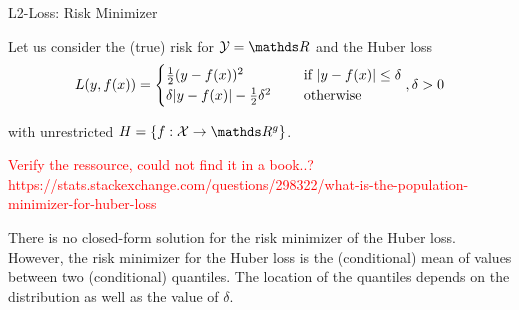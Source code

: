 \begin{vbframe}{L2-Loss: Risk Minimizer}

Let us consider the (true) risk for  $\Yspace = \R$ and the Huber loss
$$
L(y, f(x)) = \begin{cases}
  \frac{1}{2}(y - f(x))^2  & \text{ if } |y - f(x)| \le \delta \\
  \delta |y - f(x)|-\frac{1}{2}\delta^2 \quad & \text{ otherwise }
  \end{cases}, \delta > 0
$$

 with unrestricted $\Hspace = \{f: \Xspace \to \R^g\}$. 

\lz 


\textcolor{red}{Verify the ressource, could not find it in a book..? https://stats.stackexchange.com/questions/298322/what-is-the-population-minimizer-for-huber-loss
}

There is no closed-form solution for the risk minimizer of the Huber loss. However, the risk minimizer for the Huber loss is the (conditional) mean of values between two (conditional) quantiles. The location of the quantiles depends on the distribution as well as the value of $\delta$. 

\end{vbframe}


